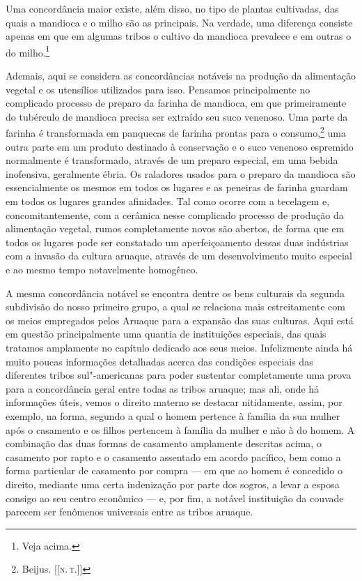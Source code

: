 Uma concordância maior existe, além disso, no tipo de plantas
cultivadas, das quais a mandioca e o milho são as principais. Na
verdade, uma diferença consiste apenas em que em algumas tribos o
cultivo da mandioca prevalece e em outras o do milho.\footnote{Veja
  acima.}

Ademais, aqui se considera as concordâncias notáveis na produção da
alimentação vegetal e os utensílios utilizados para isso. Pensamos
principalmente no complicado processo de preparo da farinha de
mandioca, em que primeiramente do tubérculo de mandioca precisa ser
extraído seu suco venenoso. Uma parte da farinha é transformada em
panquecas de farinha prontas para o consumo,\footnote{Beijus. {[}{[}\textsc{n.\,t.}{]}{]}} uma
outra parte em um produto destinado à conservação e o suco venenoso
espremido normalmente é transformado, através de um preparo especial, em
uma bebida inofensiva, geralmente ébria. Os raladores usados para o
preparo da mandioca são essencialmente os mesmos em todos os lugares e
as peneiras de farinha guardam em todos os lugares grandes afinidades.
Tal como ocorre com a tecelagem e, concomitantemente, com a cerâmica
nesse complicado processo de produção da alimentação vegetal, rumos
completamente novos são abertos, de forma que em todos os lugares pode
ser constatado um aperfeiçoamento dessas duas indústrias com a invasão
da cultura aruaque, através de um desenvolvimento muito especial e ao
mesmo tempo notavelmente homogêneo.

A mesma concordância notável se encontra dentre os bens culturais da
segunda subdivisão do nosso primeiro grupo, a qual se relaciona mais
estreitamente com os meios empregados pelos Aruaque para a expansão das
suas culturas. Aqui está em questão principalmente uma quantia de
instituições especiais, das quais tratamos amplamente no capítulo
dedicado aos seus meios. Infelizmente ainda há muito poucas informações
detalhadas acerca das condições especiais das diferentes tribos
sul"-americanas para poder sustentar completamente uma prova para a
concordância geral entre todas as tribos aruaque; mas ali, onde há
informações úteis, vemos o direito materno se destacar nitidamente,
assim, por exemplo, na forma, segundo a qual o homem pertence à família
da sua mulher após o casamento e os filhos pertencem à família da
mulher e não à do homem. A combinação das duas formas de casamento
amplamente descritas acima, o casamento por rapto e o casamento
assentado em acordo pacífico, bem como a forma particular de casamento
por compra --- em que ao homem é concedido o direito, mediante uma certa
indenização por parte dos sogros, a levar a esposa consigo ao seu centro
econômico --- e, por fim, a notável instituição da couvade parecem ser
fenômenos universais entre as tribos aruaque.

